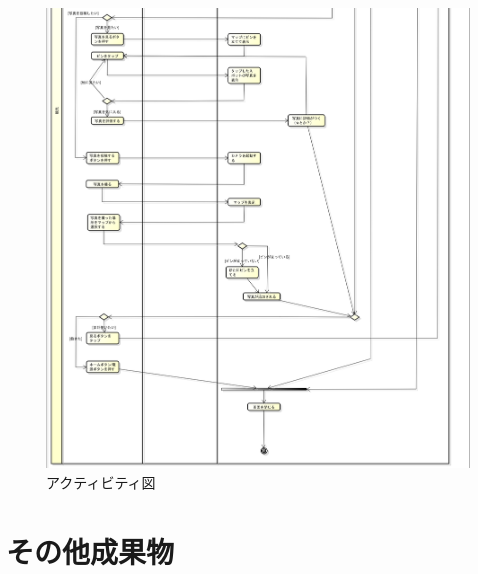 \documentclass[openany,11pt,papersize]{jsbook}
\begin{document}
\begin{appendix}
       \begin{figure}{}
        \begin{center}
\includegraphics[width=20cm, bb=0 0 1880 2041]{project_activity2.2-2.png}
        \end{center}
                 \caption{アクティビティ図}
 \label{fig:one}
      \end{figure}
      
\chapter{その他成果物}  



\end{appendix}
\end{document}
